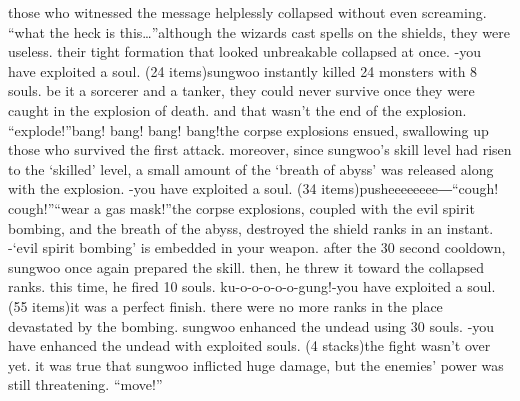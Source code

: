 those who witnessed the message helplessly collapsed without even screaming.
“what the heck is this…”although the wizards cast spells on the shields, they were useless.
 their tight formation that looked unbreakable collapsed at once.
-you have exploited a soul.
 (24 items)sungwoo instantly killed 24 monsters with 8 souls.
 be it a sorcerer and a tanker, they could never survive once they were caught in the explosion of death.
and that wasn’t the end of the explosion.
“explode!”bang! bang! bang! bang!the corpse explosions ensued, swallowing up those who survived the first attack.
 moreover, since sungwoo’s skill level had risen to the ‘skilled’ level, a small amount of the ‘breath of abyss’ was released along with the explosion.
-you have exploited a soul.
 (34 items)pusheeeeeeee―“cough! cough!”“wear a gas mask!”the corpse explosions, coupled with the evil spirit bombing, and the breath of the abyss, destroyed the shield ranks in an instant.
-‘evil spirit bombing’ is embedded in your weapon.
after the 30 second cooldown, sungwoo once again prepared the skill.
 then, he threw it toward the collapsed ranks.
 this time, he fired 10 souls.
ku-o-o-o-o-o-gung!-you have exploited a soul.
 (55 items)it was a perfect finish.
 there were no more ranks in the place devastated by the bombing.
sungwoo enhanced the undead using 30 souls.
-you have enhanced the undead with exploited souls.
 (4 stacks)the fight wasn’t over yet.
 it was true that sungwoo inflicted huge damage, but the enemies’ power was still threatening.
“move!”

 